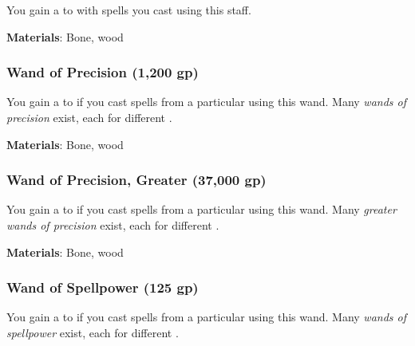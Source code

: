 You gain a   to  with spells you cast using this staff.



\textbf{Materials}: Bone, wood


\lowercase{\hypertarget{item:Wand of Precision}{}}\label{item:Wand of Precision}
\hypertarget{item:Wand of Precision}{\subsubsection{Wand of Precision\hfill{} (1,200 gp)}}

You gain a   to  if you cast spells from a particular  using this wand.
Many \textit{wands of precision} exist, each for different .



\textbf{Materials}: Bone, wood


\lowercase{\hypertarget{item:Wand of Precision, Greater}{}}\label{item:Wand of Precision, Greater}
\hypertarget{item:Wand of Precision, Greater}{\subsubsection{Wand of Precision, Greater\hfill{} (37,000 gp)}}

You gain a   to  if you cast spells from a particular  using this wand.
Many \textit{greater wands of precision} exist, each for different .



\textbf{Materials}: Bone, wood


\lowercase{\hypertarget{item:Wand of Spellpower}{}}\label{item:Wand of Spellpower}
\hypertarget{item:Wand of Spellpower}{\subsubsection{Wand of Spellpower\hfill{} (125 gp)}}

You gain a   to  if you cast spells from a particular  using this wand.
Many \textit{wands of spellpower} exist, each for different .



